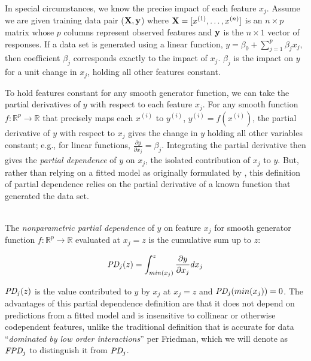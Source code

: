 \documentclass[11pt]{article}
\newcommand{\todo}[1]{{{\small\color{red}{[#1]}}}}
\renewcommand{\xi}{x^{(i)}}
\begin{document}
In special circumstances, we know the precise impact of each feature $x_j$. Assume we are given training data pair ($\bf X, y$) where ${\bf X} = [x^{(1)}, \ldots, x^{(n)}]$ is an $n \times p$ matrix whose $p$ columns represent observed features and ${\bf y}$ is the $n \times 1$ vector of responses.  If a data set is generated using a linear function, $y = \beta_0 + \sum_{j=1}^p \beta_j x_j$, \todo{assumes independence of $x_j$? I don't think so since we have complete equation} then coefficient $\beta_j$ corresponds exactly to the impact of $x_j$.  $\beta_j$ is the impact on $y$ for a unit change in $x_j$, holding all other features constant.

To hold features constant for any smooth generator function, we can take the partial derivatives of $y$ with respect to each feature $x_j$. For any smooth function $f:\mathbb{R}^{p} \rightarrow \mathbb{R}$ that precisely maps each $\xi$ to $y^{(i)}$, ${y^{(i)}} = f(\xi)$, the partial derivative of $y$ with respect to $x_j$ gives the change in $y$ holding all other variables constant; e.g., for linear functions, $\frac{\partial y}{\partial x_j}=\beta_j$. Integrating the partial derivative then gives the {\em partial dependence}  of $y$ on $x_j$, the isolated contribution of $x_j$ to $y$. But, rather than relying on a fitted model as originally formulated by \citep{PDP}, this definition of partial dependence relies on the partial derivative of a known function that generated the data set.

~\\
 The {\em nonparametric partial dependence} of $y$ on feature $x_j$ for smooth generator function $f:\mathbb{R}^{p} \rightarrow \mathbb{R}$ evaluated at $x_j = z$ is the cumulative sum up to $z$:

\begin{equation}\label{eq:pd}
\text{\it PD}_j(z) = \int_{min(x_j)}^z \frac{\partial y}{\partial x_j} dx_j
\end{equation}

$\text{\it PD}_j(z)$ is the value contributed to $y$ by $x_j$ at $x_j = z$ and $\text{\it PD}_j(min(x_j))=0$. The advantages of this partial dependence definition are that it does not depend on predictions from a fitted model and is insensitive to collinear or otherwise codependent features, unlike the traditional definition that is accurate for data ``{\em dominated by low order interactions}'' per Friedman, which we will denote as $\text{\it FPD}_j$ to distinguish it from $\text{\it PD}_j$.
\end{document}

